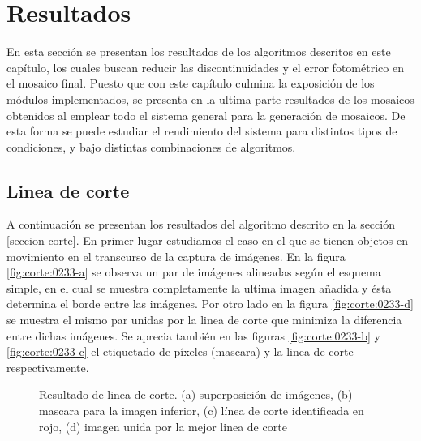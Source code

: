 \section{Resultados}

En esta sección se presentan los resultados de los algoritmos descritos en este capítulo, los cuales buscan reducir las discontinuidades y el error fotométrico en el mosaico final. Puesto que con este capítulo culmina la exposición de los módulos implementados, se presenta en la ultima parte resultados de los mosaicos obtenidos al emplear todo el sistema general para la generación de mosaicos. De esta forma se puede estudiar el rendimiento del sistema para distintos tipos de condiciones, y bajo distintas combinaciones de algoritmos.

\subsection*{Linea de corte}

A continuación se presentan los resultados del algoritmo descrito en la sección \ref{seccion-corte}. En primer lugar estudiamos el caso en el que se tienen objetos en movimiento en el transcurso de la captura de imágenes. En la figura \ref{fig:corte:0233-a} se observa un par de imágenes alineadas según el esquema simple, en el cual se muestra completamente la ultima imagen añadida y ésta determina el borde entre las imágenes. Por otro lado en la figura \ref{fig:corte:0233-d} se muestra el mismo par unidas por la linea de corte que minimiza la diferencia entre dichas imágenes. Se aprecia también en las figuras \ref{fig:corte:0233-b} y \ref{fig:corte:0233-c} el etiquetado de píxeles (mascara) y la linea de corte respectivamente.

\begin{figure}[H]
	\centering     %
	\hspace{0.005\textwidth}%
	

	\caption[Resultado de linea de corte: \textit{Chuspa}]{Resultado de linea de corte. (a) superposición de imágenes, (b) mascara para la imagen inferior, (c) línea de corte identificada en rojo, (d) imagen unida por la mejor linea de corte}
	\label{imagen:cut:0233}
\end{figure}


